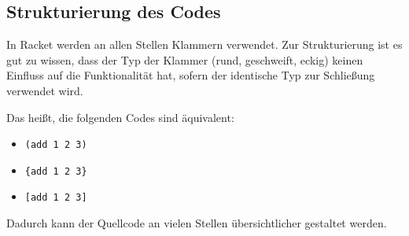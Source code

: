 \subsection{Strukturierung des Codes}
	In Racket werden an allen Stellen Klammern verwendet. Zur Strukturierung ist es gut zu wissen, dass der Typ der Klammer (rund, geschweift, eckig) keinen Einfluss auf die Funktionalität hat, sofern der identische Typ zur Schließung verwendet wird.
	
	Das heißt, die folgenden Codes sind äquivalent:
	\begin{itemize}
		\item \lstinline[language = Racket]|(add 1 2 3)|
		\item \lstinline[language = Racket]|{add 1 2 3}|
		\item \lstinline[language = Racket]|[add 1 2 3]|
	\end{itemize}

	Dadurch kann der Quellcode an vielen Stellen übersichtlicher gestaltet werden.
